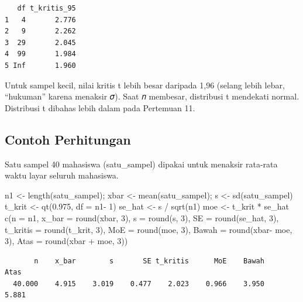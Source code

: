 \documentclass[
  indonesian,
  letterpaper,
]{book}
\newenvironment{Shaded}{\begin{snugshade}}{\end{snugshade}}
\newcommand{\AttributeTok}[1]{\textcolor[rgb]{0.40,0.45,0.13}{#1}}
\newcommand{\DecValTok}[1]{\textcolor[rgb]{0.68,0.00,0.00}{#1}}
\newcommand{\FloatTok}[1]{\textcolor[rgb]{0.68,0.00,0.00}{#1}}
\newcommand{\FunctionTok}[1]{\textcolor[rgb]{0.28,0.35,0.67}{#1}}
\newcommand{\NormalTok}[1]{\textcolor[rgb]{0.00,0.23,0.31}{#1}}
\newcommand{\OtherTok}[1]{\textcolor[rgb]{0.00,0.23,0.31}{#1}}
\newcommand{\SpecialCharTok}[1]{\textcolor[rgb]{0.37,0.37,0.37}{#1}}
\begin{document}
\begin{verbatim}
   df t_kritis_95
1   4       2.776
2   9       2.262
3  29       2.045
4  99       1.984
5 Inf       1.960
\end{verbatim}

Untuk sampel kecil, nilai kritis t lebih besar daripada 1,96 (selang
lebih lebar, ``hukuman'' karena menaksir 𝜎). Saat 𝑛 membesar, distribusi
t mendekati normal. Distribusi t dibahas lebih dalam pada Pertemuan 11.

\subsection{Contoh Perhitungan}\label{contoh-perhitungan}

Satu sampel 40 mahasiswa (satu\_sampel) dipakai untuk menaksir rata-rata
waktu layar seluruh mahasiswa.

\begin{Shaded}
\begin{Highlighting}[]
\NormalTok{n1 }\OtherTok{\textless{}{-}} \FunctionTok{length}\NormalTok{(satu\_sampel); xbar }\OtherTok{\textless{}{-}} \FunctionTok{mean}\NormalTok{(satu\_sampel); s }\OtherTok{\textless{}{-}} \FunctionTok{sd}\NormalTok{(satu\_sampel)}
\NormalTok{t\_krit }\OtherTok{\textless{}{-}} \FunctionTok{qt}\NormalTok{(}\FloatTok{0.975}\NormalTok{, }\AttributeTok{df =}\NormalTok{ n1}\SpecialCharTok{{-}} \DecValTok{1}\NormalTok{)}
\NormalTok{se\_hat }\OtherTok{\textless{}{-}}\NormalTok{ s }\SpecialCharTok{/} \FunctionTok{sqrt}\NormalTok{(n1)}
\NormalTok{moe }\OtherTok{\textless{}{-}}\NormalTok{ t\_krit }\SpecialCharTok{*}\NormalTok{ se\_hat}
\FunctionTok{c}\NormalTok{(}\AttributeTok{n =}\NormalTok{ n1, }\AttributeTok{x\_bar =} \FunctionTok{round}\NormalTok{(xbar, }\DecValTok{3}\NormalTok{), }\AttributeTok{s =} \FunctionTok{round}\NormalTok{(s, }\DecValTok{3}\NormalTok{), }\AttributeTok{SE =} \FunctionTok{round}\NormalTok{(se\_hat, }\DecValTok{3}\NormalTok{),}
\AttributeTok{t\_kritis =} \FunctionTok{round}\NormalTok{(t\_krit, }\DecValTok{3}\NormalTok{), }\AttributeTok{MoE =} \FunctionTok{round}\NormalTok{(moe, }\DecValTok{3}\NormalTok{),}
\AttributeTok{Bawah =} \FunctionTok{round}\NormalTok{(xbar}\SpecialCharTok{{-}}\NormalTok{ moe, }\DecValTok{3}\NormalTok{), }\AttributeTok{Atas =} \FunctionTok{round}\NormalTok{(xbar }\SpecialCharTok{+}\NormalTok{ moe, }\DecValTok{3}\NormalTok{))}
\end{Highlighting}
\end{Shaded}

\begin{verbatim}
       n    x_bar        s       SE t_kritis      MoE    Bawah     Atas 
  40.000    4.915    3.019    0.477    2.023    0.966    3.950    5.881 
\end{verbatim}
\end{document}
